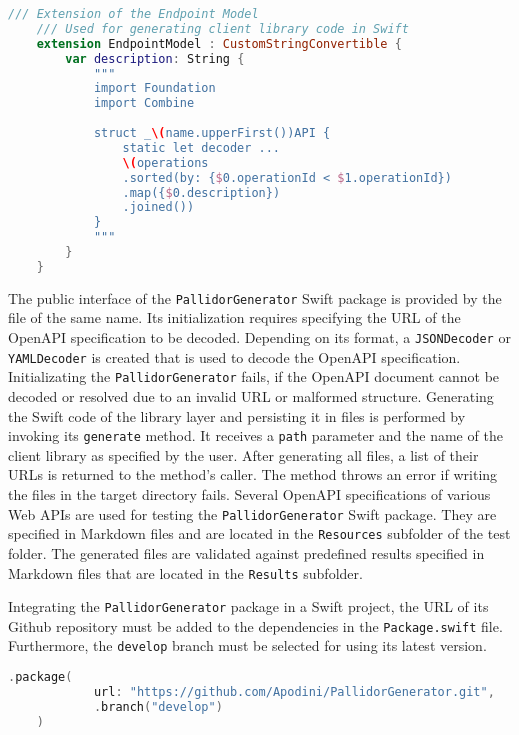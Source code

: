 \begin{lstlisting}[language=Swift, caption={Source code string template for an endpoint}, captionpos=b, label={lst:EndpointTempl}]
	/// Extension of the Endpoint Model
	/// Used for generating client library code in Swift
	extension EndpointModel : CustomStringConvertible {
		var description: String {
			"""
			import Foundation
			import Combine
			
			struct _\(name.upperFirst())API {
				static let decoder ...
				\(operations
				.sorted(by: {$0.operationId < $1.operationId})
				.map({$0.description})
				.joined())
			}
			"""
		}
	}

\end{lstlisting}

The public interface of the \texttt{PallidorGenerator} Swift package is provided by the file of the same name. Its initialization requires specifying the URL of the OpenAPI specification to be decoded. Depending on its format, a \texttt{JSON\-Decoder} or \texttt{YAML\-Decoder} is created that is used to decode the OpenAPI specification. Initializating the \texttt{Pal\-li\-dor\-Gen\-er\-ator} fails, if the OpenAPI document cannot be decoded or resolved due to an invalid URL or malformed structure. Generating the Swift code of the library layer and persisting it in files is performed by invoking its \texttt{generate} method. It receives a \texttt{path} parameter and the name of the client library as specified by the user. After generating all files, a list of their URLs is returned to the method's caller. The method throws an error if writing the files in the target directory fails. Several OpenAPI specifications of various Web APIs are used for testing the \texttt{PallidorGenerator} Swift package. They are specified in Markdown files and are located in the \texttt{Resources} subfolder of the test folder. The generated files are validated against predefined results specified in Markdown files that are located in the \texttt{Results} subfolder. 

Integrating the \texttt{PallidorGenerator} package in a Swift project, the URL of its Github repository must be added to the dependencies in the \texttt{Package.swift} file. Furthermore, the \texttt{develop} branch must be selected for using its latest version.

\begin{lstlisting}[language=Swift, caption={Integrating PallidorGenerator in SPM}, captionpos=b, label={lst:IntegrationGenerator}]
	.package(
			url: "https://github.com/Apodini/PallidorGenerator.git", 
			.branch("develop")
	)
\end{lstlisting}


